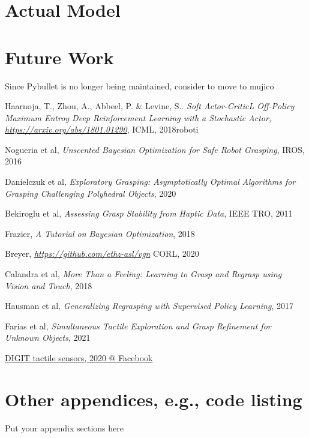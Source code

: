 \documentclass[a4paper]{report}
\begin{document}
\chapter{Actual Model}
\label{chap:4}



\chapter{Future Work}
\label{chap:5}
Since Pybullet is no longer being maintained, consider to move to mujico



\appendix


\begin{thebibliography}{9}
    Haarnoja, T., Zhou, A., Abbeel, P. & Levine, S..
    \textit{Soft Actor-CriticL Off-Policy Maximum Entroy Deep Reinforcement Learning with a Stochastic Actor, \href{https://arxiv.org/abs/1801.01290}{https://arxiv.org/abs/1801.01290}},
    ICML,
    2018roboti

    Nogueria et al,
    \textit{Unscented Bayesian Optimization for Safe Robot Grasping},
    IROS,
    2016

    Danielczuk et al,
    \textit{Exploratory Grasping: Asymptotically Optimal Algorithms for Grasping Challenging Polyhedral Objects},
    2020

    Bekiroglu et al,
    \textit{Assessing Grasp Stability from Haptic Data},
    IEEE TRO,
    2011

    Frazier,
    \textit{A Tutorial on Bayesian Optimization},
    2018

    Breyer,
    \textit{\href{https://github.com/ethz-asl/vgn}{https://github.com/ethz-asl/vgn}}
    CORL,
    2020

    Calandra et al,
    \textit{More Than a Feeling: Learning to Grasp and Regrasp using Vision and Touch},
    2018

    Hausman et al,
    \textit{Generalizing Regrasping with Supervised Policy Learning},
    2017

    Farias et al,
    \textit{Simultaneous Tactile Exploration and Grasp Refinement for Unknown Objects},
    2021

    \href{https://digit.ml/}{DIGIT tactile sensors, 2020 @ Facebook}
\end{thebibliography}

\chapter{Other appendices, e.g., code listing}
Put your appendix sections here
\end{document}

